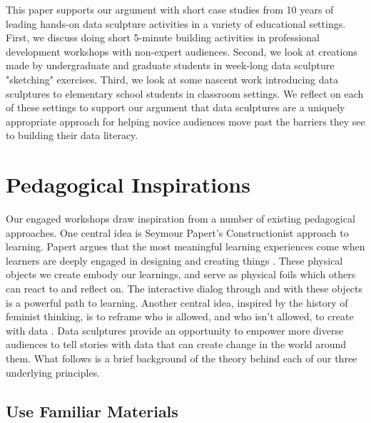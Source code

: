 \documentclass{sigchi-ext}
\begin{document}
This paper supports our argument with short case studies from 10 years of leading hands-on data sculpture activities in a variety of educational settings.  First, we discuss doing short 5-minute building activities in professional development workshops with non-expert audiences.  Second, we look at creations made by undergraduate and graduate students in week-long data sculpture "sketching" exercises.  Third, we look at some nascent work introducing data sculptures to elementary school students in classroom settings. We reflect on each of these settings to support our argument that data sculptures are a uniquely appropriate approach for helping novice audiences move past the barriers they see to building their data literacy.

\section{Pedagogical Inspirations}

Our engaged workshops draw inspiration from a number of existing pedagogical approaches. One central idea is Seymour Papert's Constructionist approach to learning. Papert argues that the most meaningful learning experiences come when learners are deeply engaged in designing and creating things \cite{Papert_1993}.  These physical objects we create embody our learnings, and serve as physical foils which others can react to and reflect on. The interactive dialog through and with these objects is a powerful path to learning. Another central idea, inspired by the history of feminist thinking, is to reframe who is allowed, and who isn't allowed, to create with data \cite{DIgnazio_Klein_2016}.  Data sculptures provide an opportunity to empower more diverse audiences to tell stories with data that can create change in the world around them. What follows is a brief background of the theory behind each of our three underlying principles. 

\subsection{Use Familiar Materials}
\end{document}
